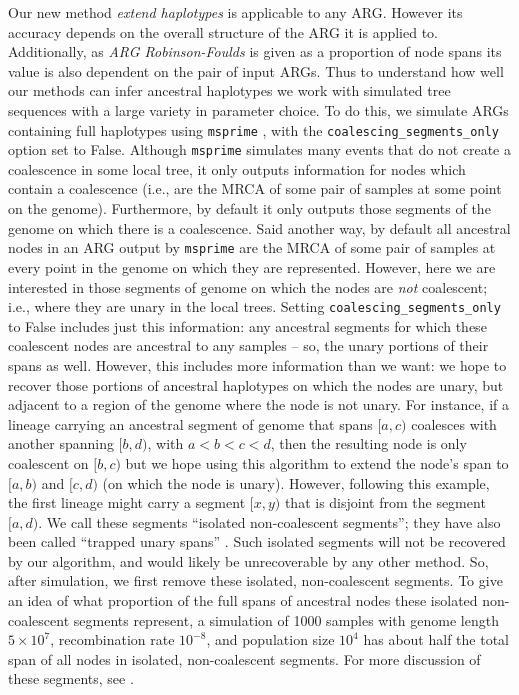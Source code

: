 \documentclass[10pt,twoside,lineno]{gsajnl}
\newcommand{\msprime}{\texttt{msprime}}
\begin{document}
Our new method \textit{extend haplotypes} is applicable to any ARG.
However its accuracy depends on the overall structure of the ARG it is applied to. 
Additionally, as \textit{ARG Robinson-Foulds}
is given as a proportion of node spans
its value is also dependent on the pair of input ARGs. 
Thus to understand how well our methods can infer ancestral haplotypes we 
work with simulated tree sequences with a large variety in parameter choice.
To do this, we simulate ARGs containing full haplotypes using \msprime{}
\citep{kelleher2016efficient,baumdicker2021efficient},
with the \texttt{coalescing\_segments\_only} option set to False.
Although \msprime{} simulates many events that do not create a coalescence in some local tree,
it only outputs information for nodes which contain a coalescence
(i.e., are the MRCA of some pair of samples at some point on the genome).
Furthermore, by default it only outputs those segments of the genome
on which there is a coalescence.
Said another way, by default all ancestral nodes in an ARG
output by \msprime{} are the MRCA of some pair of samples at every point in the genome
on which they are represented.
However, here we are interested in those segments of genome
on which the nodes are \emph{not} coalescent;
i.e., where they are unary in the local trees.
Setting \texttt{coalescing\_segments\_only} to False includes just this information:
any ancestral segments for which these coalescent nodes
are ancestral to any samples -- so, the unary portions of their spans as well.
However, this includes more information than we want:
we hope to recover those portions of ancestral haplotypes
on which the nodes are unary, but adjacent to a region of the genome where the node is not unary.
For instance, if a lineage carrying an ancestral segment of genome that spans $[a, c)$
coalesces with another spanning $[b, d)$, with $a < b < c < d$,
then the resulting node is only coalescent on $[b, c)$ but we hope using this algorithm
to extend the node's span to $[a, b)$ and $[c, d)$
(on which the node is unary).
However, following this example, the first lineage might carry a segment $[x, y)$
that is disjoint from the segment $[a, d)$.
We call these segments ``isolated non-coalescent segments'';
they have also been called ``trapped unary spans'' \citep[by][]{wong2024general}.
Such isolated segments will not be recovered by our algorithm,
and would likely be unrecoverable by any other method.
So, after simulation, we first remove these isolated, non-coalescent segments.
To give an idea of what proportion of the full spans of ancestral nodes
these isolated non-coalescent segments represent,
a simulation of 1000 samples
with genome length $5\times 10^7$, recombination rate $10^{-8}$, and population size $10^4$
has about half the total span of all nodes in isolated, non-coalescent segments.
For more discussion of these segments, see \citet{baumdicker2021efficient}.
\end{document}
